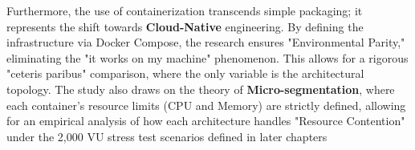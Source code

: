 Furthermore, the use of containerization transcends simple packaging; it represents the shift towards \textbf{Cloud-Native} engineering. By defining the infrastructure via Docker Compose, the research ensures "Environmental Parity," eliminating the "it works on my machine" phenomenon. This allows for a rigorous "ceteris paribus" comparison, where the only variable is the architectural topology. The study also draws on the theory of \textbf{Micro-segmentation}, where each container’s resource limits (CPU and Memory) are strictly defined, allowing for an empirical analysis of how each architecture handles "Resource Contention" under the 2,000 VU stress test scenarios defined in later chapters
